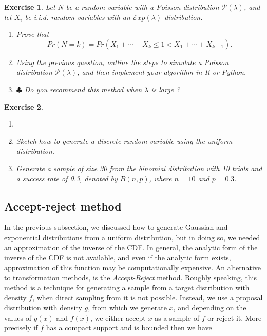 \documentclass{article}\usepackage[]{graphicx}\usepackage[]{xcolor}
\newtheorem{exercise}{Exercise}
\begin{document}
\begin{exercise}
Let $N$ be a random variable with a Poisson distribution $\mathcal{P}(\lambda)$, and let $X_i$ be i.i.d. random variables with an $\mathcal{E}xp(\lambda)$ distribution.
\begin{enumerate}
\item Prove that 
\begin{equation*}
Pr(N = k) = Pr(X_1+\cdots+X_k \leq 1 < X_1 + \cdots + X_{k+1}).
\end{equation*}
\item Using the previous question, outline the steps to simulate a Poisson distribution $\mathcal{P}(\lambda)$, and then implement your algorithm in R or Python.
\item $\clubsuit$ Do you recommend this method when $\lambda$ is large ?
\end{enumerate}
\end{exercise}

\begin{exercise}
\begin{enumerate}
\item[]
\item Sketch how to generate a discrete random variable using the uniform distribution.
\item Generate a sample of size 30 from the binomial distribution with 10 trials and a success rate of 0.3, denoted by $B(n,p)$, where $n = 10$ and $p = 0.3$.
\end{enumerate}
\end{exercise}

\subsection{Accept-reject method}
In the previous subsection, we discussed how to generate Gaussian and exponential distributions from a uniform distribution, but in doing so, we needed an approximation of the inverse of the CDF. In general, the analytic form of the inverse of the CDF is not available, and even if the analytic form exists, approximation of this function may be computationally expensive. An alternative to transformation methods, is the \textit{Accept-Reject} method.
Roughly speaking, this method is a technique for generating a sample from a target distribution with density $f$, when direct sampling from it is not possible. Instead, we use a proposal distribution with density $g$, from which we generate $x$, and depending on the values of $g(x)$ and $f(x)$, we either accept $x$ as a sample of $f$ or reject it. More precisely if $f$ has a compact support and is bounded then we have 
\end{document}
